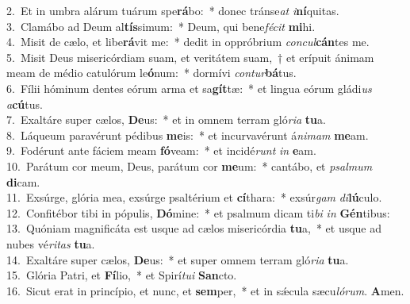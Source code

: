 {2.~}Et in umbra alárum tuárum spe\textbf{rá}bo:~* donec tránse\textit{at} \textit{i}\textbf{ní}quitas.\\
{3.~}Clamábo ad Deum al\textbf{tís}simum:~* Deum, qui bene\textit{fé}\textit{cit} \textbf{mi}hi.\\
{4.~}Misit de cælo, et libe\textbf{rá}vit me:~* dedit in oppróbrium \textit{con}\textit{cul}\textbf{cán}tes me.\\
{5.~}Misit Deus misericórdiam suam, et veritátem suam,~† et erípuit ánimam meam de médio catulórum le\textbf{ó}num:~* dormívi \textit{con}\textit{tur}\textbf{bá}tus.\\
{6.~}Fílii hóminum dentes eórum arma et sa\textbf{gít}tæ:~* et lingua eórum gládi\textit{us} \textit{a}\textbf{cú}tus.\\
{7.~}Exaltáre super cælos, \textbf{De}us:~* et in omnem terram gló\textit{ri}\textit{a} \textbf{tu}a.\\
{8.~}Láqueum paravérunt pédibus \textbf{me}is:~* et incurvavérunt á\textit{ni}\textit{mam} \textbf{me}am.\\
{9.~}Fodérunt ante fáciem meam \textbf{fó}veam:~* et incidé\textit{runt} \textit{in} \textbf{e}am.\\
{10.~}Parátum cor meum, Deus, parátum cor \textbf{me}um:~* cantábo, et \textit{psal}\textit{mum} \textbf{di}cam.\\
{11.~}Exsúrge, glória mea, exsúrge psaltérium et \textbf{cí}thara:~* exsúr\textit{gam} \textit{di}\textbf{lú}culo.\\
{12.~}Confitébor tibi in pópulis, \textbf{Dó}mine:~* et psalmum dicam ti\textit{bi} \textit{in} \textbf{Gén}tibus:\\
{13.~}Quóniam magnificáta est usque ad cælos misericórdia \textbf{tu}a,~* et usque ad nubes vé\textit{ri}\textit{tas} \textbf{tu}a.\\
{14.~}Exaltáre super cælos, \textbf{De}us:~* et super omnem terram gló\textit{ri}\textit{a} \textbf{tu}a.\\
{15.~}Glória Patri, et \textbf{Fí}lio,~* et Spirí\textit{tu}\textit{i} \textbf{San}cto.\\
{16.~}Sicut erat in princípio, et nunc, et \textbf{sem}per,~* et in sǽcula sæcu\textit{ló}\textit{rum}. \textbf{A}men.\\
